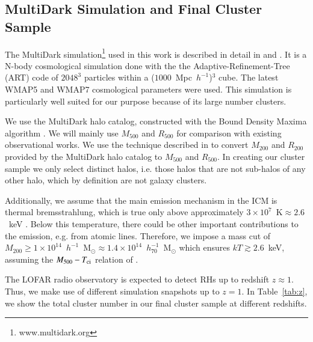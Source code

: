 \documentclass[traditabstract]{aa}
\newcommand{\rmn}{\mathrm}
\begin{document}
\subsection{MultiDark Simulation and Final Cluster Sample}
\label{sec:2.1}
The MultiDark simulation\footnote[3]{www.multidark.org} used in this work is
described in detail in \cite{2011arXiv1104.5130P} and
\cite{2011arXiv1109.0003R}.  It is a N-body cosmological simulation done with
the the Adaptive-Refinement-Tree (ART) code \citep{1997ApJS..111...73K} of
$2048^3$ particles within a ($1000$~Mpc~$h^{-1}$)$^3$ cube. The latest WMAP5 and
WMAP7 cosmological parameters were used. This simulation is particularly well
suited for our purpose because of its large number clusters.
 
We use the MultiDark halo catalog, constructed with the Bound Density Maxima
algorithm \citep{1997astro.ph.12217K}.  We will mainly use $M_{500}$ and
$R_{500}$ for comparison with existing observational works.  We use the
technique described in \cite{2003ApJ...584..702H} to convert $M_{200}$ and
$R_{200}$ provided by the MultiDark halo catalog to $M_{500}$ and $R_{500}$.  In
creating our cluster sample we only select distinct halos, i.e. those halos that
are not sub-halos of any other halo, which by definition are not galaxy clusters.

Additionally, we assume that the main emission mechanism in the ICM is thermal
bremsstrahlung, which is true only above approximately
$3\times10^{7}$~$\rmn{K}\approx2.6$~keV \citep{1988xrec.book.....S}. Below this
temperature, there could be other important contributions to the emission,
e.g. from atomic lines. Therefore, we impose a mass cut of
$M_{200}\geq1\times10^{14}$~$h^{-1}$~M$_{\odot}\approx1.4\times10^{14}$~$h_{70}^{-1}$~M$_{\odot}$
which ensures $kT \gtrsim 2.6$~keV, assuming the $M_{500} - T_{\rm{ci}}$ relation
of \cite{2010MNRAS.406.1773M}.

The LOFAR radio observatory is expected to detect RHs up to redshift $z \approx
1$. Thus, we make use of different simulation snapshots up to $z=1$. In
Table~\ref{tab:z}, we show the total cluster number in our final cluster sample
at different redshifts.
\end{document}
